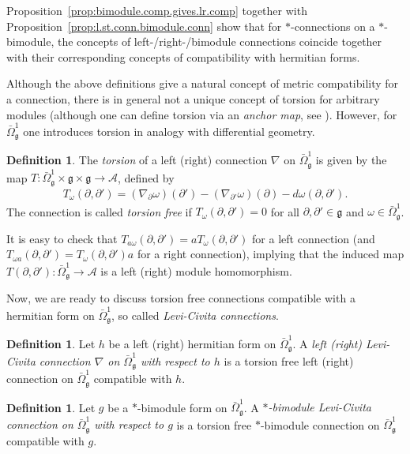 \documentclass{amsart}
\theoremstyle{definition}
\newtheorem{definition}[theorem]{Definition}
\theoremstyle{remark}
\numberwithin{equation}{section}
\newcommand{\A}{\mathcal{A}}
\renewcommand{\d}{\partial}
\newcommand{\g}{\mathfrak{g}}
\newcommand{\Omegabg}[1]{\bar{\Omega}^{#1}_{\g}}
\renewcommand{\emph}[1]{\textit{#1}}
\begin{document}
\noindent 
Proposition~\ref{prop:bimodule.comp.gives.lr.comp} together with
Proposition~\ref{prop:l.st.conn.bimodule.conn} show that for
$\ast$-connections on a $\ast$-bimodule, the concepts of
left-/right-/bimodule connections coincide together with their
corresponding concepts of compatibility with hermitian forms.

Although the above definitions give a natural concept of metric
compatibility for a connection, there is in general
not a unique concept of torsion for arbitrary modules (although one
can define torsion via an \emph{anchor map}, see
\cite{aw:curvature.three.sphere}). However, for $\Omegabg{1}$ one
introduces torsion in analogy with differential geometry.

\begin{definition}
  The \emph{torsion} of a left (right) connection
  $\nabla$ on $\Omegabg{1}$ is given by the map
  $T:\Omegabg{1}\times\g\times\g\to\A$, defined by
  \begin{align}\label{eq:def.torsion}
    T_\omega(\d,\d') = (\nabla_{\d}\omega)(\d')-(\nabla_{\d'}\omega)(\d)
    -d\omega(\d,\d').
  \end{align}
  The connection is called \emph{torsion free} if $T_\omega(\d,\d')=0$ for all
  $\d,\d'\in\g$ and $\omega\in\Omegabg{1}$.
\end{definition}

\noindent
It is easy to check that $T_{a\omega}(\d,\d')=aT_\omega(\d,\d')$ for a
left connection (and $T_{\omega a}(\d,\d')=T_{\omega}(\d,\d')a$ for a
right connection), implying that the induced map
$T(\d,\d'):\Omegabg{1}\to\A$ is a left (right) module
homomorphism.

Now, we are ready to discuss torsion free connections
compatible with a hermitian form on $\Omegabg{1}$, so called
\emph{Levi-Civita connections}.

\begin{definition}
  Let $h$ be a left (right) hermitian form on $\Omegabg{1}$. A \emph{left
     (right) Levi-Civita connection $\nabla$ on $\Omegabg{1}$ with respect to
    $h$} is a torsion free left (right) connection on $\Omegabg{1}$ compatible
  with $h$.
\end{definition}

\begin{definition}
  Let $g$ be a $\ast$-bimodule form on $\Omegabg{1}$. A
  \emph{$\ast$-bimodule Levi-Civita connection on $\Omegabg{1}$ with
    respect to $g$} is a torsion free $\ast$-bimodule connection on
  $\Omegabg{1}$ compatible with $g$.
\end{definition}
\end{document}
